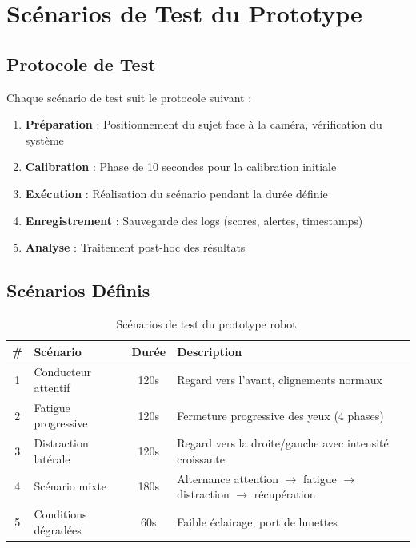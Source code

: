 \documentclass[12pt,a4paper,twoside]{report}
\begin{document}
\section{Scénarios de Test du Prototype}

\subsection{Protocole de Test}

Chaque scénario de test suit le protocole suivant :
\begin{enumerate}[leftmargin=2cm]
    \item \textbf{Préparation} : Positionnement du sujet face à la caméra, vérification du système
    \item \textbf{Calibration} : Phase de 10 secondes pour la calibration initiale
    \item \textbf{Exécution} : Réalisation du scénario pendant la durée définie
    \item \textbf{Enregistrement} : Sauvegarde des logs (scores, alertes, timestamps)
    \item \textbf{Analyse} : Traitement post-hoc des résultats
\end{enumerate}

\subsection{Scénarios Définis}

\begin{table}[H]
\centering
\caption{Scénarios de test du prototype robot.}
\label{tab:robot_scenarios}
\renewcommand{\arraystretch}{1.4}
\begin{tabularx}{\textwidth}{|c|l|c|X|}
\hline
\rowcolor{stellantisblue!15}
\textbf{\#} & \textbf{Scénario} & \textbf{Durée} & \textbf{Description} \\
\hline
1 & Conducteur attentif & 120s & Regard vers l'avant, clignements normaux \\
\hline
2 & Fatigue progressive & 120s & Fermeture progressive des yeux (4 phases) \\
\hline
3 & Distraction latérale & 120s & Regard vers la droite/gauche avec intensité croissante \\
\hline
4 & Scénario mixte & 180s & Alternance attention $\rightarrow$ fatigue $\rightarrow$ distraction $\rightarrow$ récupération \\
\hline
5 & Conditions dégradées & 60s & Faible éclairage, port de lunettes \\
\hline
\end{tabularx}
\end{table}
\end{document}
